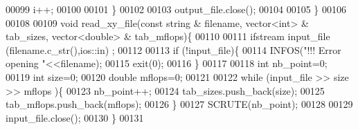 \begin{DoxyCode}
00099     i++;
00100 
00101   \}
00102 
00103   output\_file.close();
00104 
00105 \}
00106 
00108 
00109 \textcolor{keywordtype}{void} read\_xy\_file(\textcolor{keyword}{const} \textcolor{keywordtype}{string} & filename, vector<int> & tab\_sizes, vector<double> & tab\_mflops)\{
00110 
00111   ifstream input\_file (filename.c\_str(),ios::in) ;
00112 
00113   \textcolor{keywordflow}{if} (!input\_file)\{
00114     INFOS(\textcolor{stringliteral}{"!!! Error opening "}<<filename);
00115     exit(0);
00116   \}
00117   
00118   \textcolor{keywordtype}{int} nb\_point=0;
00119   \textcolor{keywordtype}{int} size=0;
00120   \textcolor{keywordtype}{double} mflops=0;
00121 
00122   \textcolor{keywordflow}{while} (input\_file >> size >> mflops )\{
00123     nb\_point++;
00124     tab\_sizes.push\_back(size);
00125     tab\_mflops.push\_back(mflops);
00126   \}
00127   SCRUTE(nb\_point);
00128 
00129   input\_file.close();
00130 \}
00131 
\end{DoxyCode}
